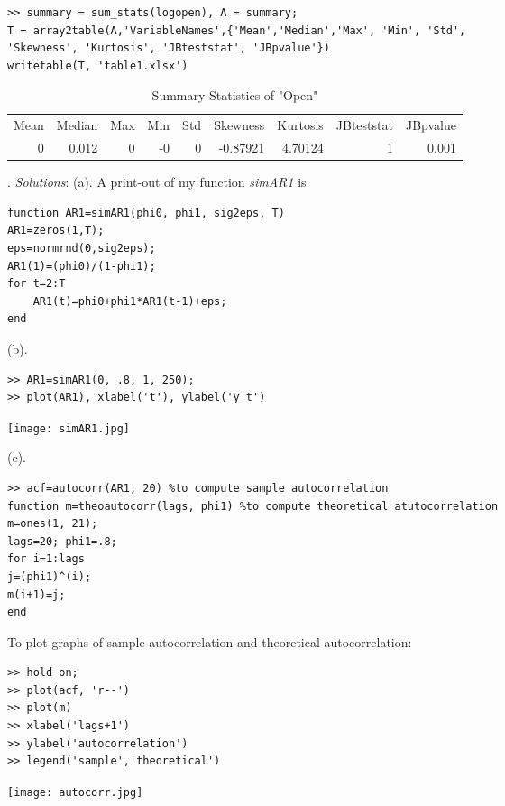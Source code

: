 \documentclass[11pt]{article}
\begin{document}
\begin{lstlisting}
>> summary = sum_stats(logopen), A = summary;
T = array2table(A,'VariableNames',{'Mean','Median','Max', 'Min', 'Std', 
'Skewness', 'Kurtosis', 'JBteststat', 'JBpvalue'})
writetable(T, 'table1.xlsx')
\end{lstlisting}
\begin{table}[htbp]
  \centering
  \caption{Summary Statistics of "Open"}
    \begin{tabular}{rrrrrrrrr}
    \multicolumn{1}{l}{Mean} & \multicolumn{1}{l}{Median} & \multicolumn{1}{l}{Max} & \multicolumn{1}{l}{Min} & \multicolumn{1}{l}{Std} & \multicolumn{1}{l}{Skewness} & \multicolumn{1}{l}{Kurtosis} & \multicolumn{1}{l}{JBteststat} & \multicolumn{1}{l}{JBpvalue} \\
    0     & 0.012 & 0     & -0    & 0     & -0.87921 & 4.70124 & 1     & 0.001 \\
    \end{tabular}%
  \label{tab:addlabel}%
\end{table}%


. \textit{Solutions}: (a). A print-out of my function \textit{simAR1} is

\begin{lstlisting}
function AR1=simAR1(phi0, phi1, sig2eps, T)
AR1=zeros(1,T);
eps=normrnd(0,sig2eps);
AR1(1)=(phi0)/(1-phi1);
for t=2:T
    AR1(t)=phi0+phi1*AR1(t-1)+eps;
end
\end{lstlisting}

(b). \begin{lstlisting}
>> AR1=simAR1(0, .8, 1, 250);
>> plot(AR1), xlabel('t'), ylabel('y_t')
\end{lstlisting}
\texttt{[image: simAR1.jpg]}

(c). \begin{lstlisting}
>> acf=autocorr(AR1, 20) %to compute sample autocorrelation
function m=theoautocorr(lags, phi1) %to compute theoretical atutocorrelation
m=ones(1, 21);
lags=20; phi1=.8;
for i=1:lags
j=(phi1)^(i);
m(i+1)=j;
end
\end{lstlisting}

To plot graphs of sample autocorrelation and theoretical autocorrelation:

\begin{lstlisting}
>> hold on;
>> plot(acf, 'r--')
>> plot(m)
>> xlabel('lags+1')
>> ylabel('autocorrelation')
>> legend('sample','theoretical')
\end{lstlisting}
\texttt{[image: autocorr.jpg]}
\end{document}

